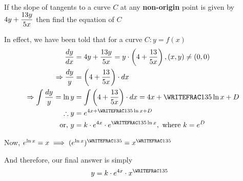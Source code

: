 

\question[3] If the slope of tangents to a curve $C$ at any \textbf{non-origin} point is given by 
$4 y + \dfrac{13 y}{5 x}$ then find the equation of $C$


\watchout

\ifprintanswers
\fi 

\begin{solution}[\halfpage]
  In effect, we have been told that for a curve $C: y = f(x)$ 
  \begin{align}
    \dfrac{dy}{dx} &= \vbone y + \dfrac{\vbtwo y}{\vbthree x} 
    = y\cdot\left(\vbone + \dfrac{\vbtwo}{\vbthree x} \right), (x,y)\neq(0,0) \\
    \Rightarrow \dfrac{dy}{y} &= \left(\vbone + \dfrac{\vbtwo}{\vbthree x}\right)\cdot dx \\
    \Rightarrow\int\dfrac{dy}{y} = \ln y &= \int \left(\vbone + \dfrac{\vbtwo}{\vbthree x}\right)\cdot dx =  \vbone x + \WRITEFRAC\vbtwo\vbthree\ln x + D \\
    \therefore y &= e^{\vbone x + \WRITEFRAC\vbtwo\vbthree\ln x + D} \\
    \text{or, } y &= k\cdot e^{\vbone x}\cdot e^{\WRITEFRAC\vbtwo\vbthree\ln x}, \text{ where } k = e^D
  \end{align}
  
  Now, $e^{\ln x} = x \implies (e^{\ln x})^{\WRITEFRAC\vbtwo\vbthree} = x^{\WRITEFRAC\vbtwo\vbthree}$
  
  And therefore, our final answer is simply
  \begin{align}
    y &= k\cdot e^{\vbone x}\cdot x^{\WRITEFRAC\vbtwo\vbthree}
  \end{align}
\end{solution}


